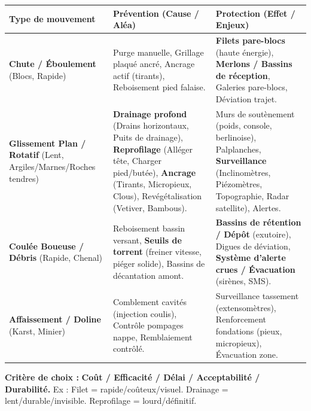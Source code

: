 \documentclass[11pt]{article}
\begin{document}
\begin{propriete}
    \begin{center}
        \begin{tabularx}{\linewidth}{|l|X|X|}\hline
        \rowcolor{popblueL} \textbf{Type de mouvement} & \textbf{Prévention (Cause / Aléa)} & \textbf{Protection (Effet / Enjeux)} \\ \hline
        \textbf{Chute / Éboulement} (Blocs, Rapide) & Purge manuelle, Grillage plaqué ancré, Ancrage actif (tirants), Reboisement pied falaise. & \textbf{Filets pare-blocs} (haute énergie), \textbf{Merlons / Bassins de réception}, Galeries pare-blocs, Déviation trajet. \\ \hline
        \textbf{Glissement Plan / Rotatif} (Lent, Argiles/Marnes/Roches tendres) & \textbf{Drainage profond} (Drains horizontaux, Puits de drainage), \textbf{Reprofilage} (Alléger tête, Charger pied/butée), \textbf{Ancrage} (Tirants, Micropieux, Clous), Revégétalisation (Vetiver, Bambous). & Murs de soutènement (poids, console, berlinoise), Palplanches, \textbf{Surveillance} (Inclinomètres, Piézomètres, Topographie, Radar satellite), Alertes. \\ \hline
        \textbf{Coulée Boueuse / Débris} (Rapide, Chenal) & Reboisement bassin versant, \textbf{Seuils de torrent} (freiner vitesse, piéger solide), Bassins de décantation amont. & \textbf{Bassins de rétention / Dépôt} (exutoire), Digues de déviation, \textbf{Système d'alerte crues / Évacuation} (sirènes, SMS). \\ \hline
        \textbf{Affaissement / Doline} (Karst, Minier) & Comblement cavités (injection coulis), Contrôle pompages nappe, Remblaiement contrôlé. & Surveillance tassement (extensomètres), Renforcement fondations (pieux, micropieux), Évacuation zone. \\ \hline
        \end{tabularx}
    \end{center}
    \textbf{Critère de choix :} \textbf{Coût / Efficacité / Délai / Acceptabilité / Durabilité.} Ex : Filet = rapide/coûteux/visuel. Drainage = lent/durable/invisible. Reprofilage = lourd/définitif.
\end{propriete}
\end{document}
